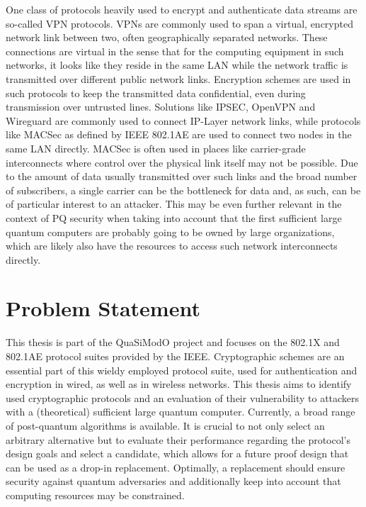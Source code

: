 One class of protocols heavily used to encrypt and authenticate data streams are so-called \ac{VPN} protocols. \acp{VPN} are commonly used to span a virtual, encrypted network link between two, often geographically separated networks. These connections are virtual in the sense that for the computing equipment in such networks, it looks like they reside in the same \ac{LAN} while the network traffic is transmitted over different public network links. Encryption schemes are used in such protocols to keep the transmitted data confidential, even during transmission over untrusted lines. Solutions like IPSEC\cite{rfc4301}, OpenVPN and Wireguard are commonly used to connect IP-Layer network links, while protocols like MACSec as defined by IEEE 802.1AE\cite{IEEE8021AE} are used to connect two nodes in the same \ac{LAN} directly. MACSec is often used in places like carrier-grade interconnects where control over the physical link itself may not be possible. Due to the amount of data usually transmitted over such links and the broad number of subscribers, a single carrier can be the bottleneck for data and, as such, can be of particular interest to an attacker. This may be even further relevant in the context of \ac{PQ} security when taking into account that the first sufficient large quantum computers are probably going to be owned by large organizations, which are likely also have the resources to access such network interconnects directly.

\section{Problem Statement}
This thesis is part of the QuaSiModO project and focuses on the 802.1X and 802.1AE protocol suites provided by the \ac{IEEE}. Cryptographic schemes are an essential part of this wieldy employed protocol suite, used for authentication and encryption in wired, as well as in wireless networks. This thesis aims to identify used cryptographic protocols and an evaluation of their vulnerability to attackers with a (theoretical) sufficient large quantum computer. Currently, a broad range of post-quantum algorithms is available. It is crucial to not only select an arbitrary alternative but to evaluate their performance regarding the protocol's design goals and select a candidate, which allows for a future proof design that can be used as a drop-in replacement. Optimally, a replacement should ensure security against quantum adversaries and additionally keep into account that computing resources may be constrained.

